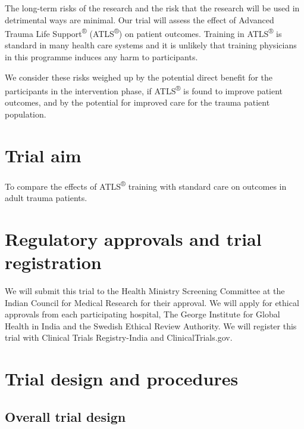 \documentclass[
]{scrartcl}
\begin{document}
The long-term risks of the research and the risk that the research will
be used in detrimental ways are minimal. Our trial will assess the
effect of Advanced Trauma Life Support\textsuperscript{®}
(ATLS\textsuperscript{®}) on patient outcomes. Training in
ATLS\textsuperscript{®} is standard in many health care systems and it
is unlikely that training physicians in this programme induces any harm
to participants.

We consider these risks weighed up by the potential direct benefit for
the participants in the intervention phase, if ATLS\textsuperscript{®}
is found to improve patient outcomes, and by the potential for improved
care for the trauma patient population.

\hypertarget{trial-aim}{%
\section{Trial aim}\label{trial-aim}}

To compare the effects of ATLS\textsuperscript{®} training with standard
care on outcomes in adult trauma patients.

\hypertarget{regulatory-approvals-and-trial-registration}{%
\section{Regulatory approvals and trial
registration}\label{regulatory-approvals-and-trial-registration}}

We will submit this trial to the Health Ministry Screening Committee at
the Indian Council for Medical Research for their approval. We will
apply for ethical approvals from each participating hospital, The George
Institute for Global Health in India and the Swedish Ethical Review
Authority. We will register this trial with Clinical Trials
Registry-India and ClinicalTrials.gov.

\hypertarget{trial-design-and-procedures}{%
\section{Trial design and
procedures}\label{trial-design-and-procedures}}

\hypertarget{overall-trial-design}{%
\subsection{Overall trial design}\label{overall-trial-design}}
\end{document}
